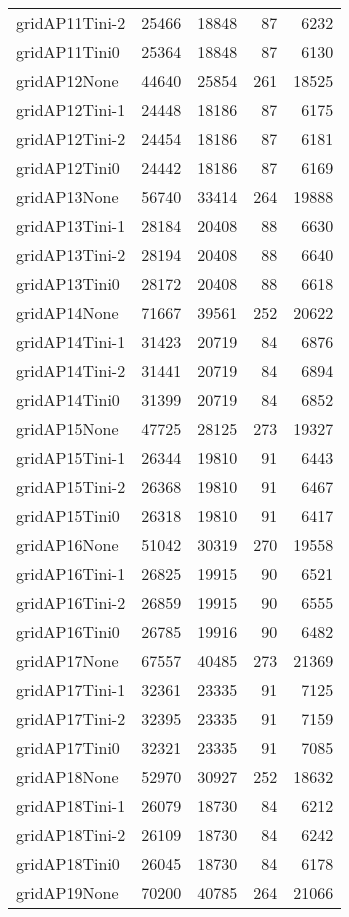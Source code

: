 \begin{longtable}{lrrrr}
gridAP11Tini-2 & 25466 & 18848 & 87 & 6232 \\
gridAP11Tini0 & 25364 & 18848 & 87 & 6130 \\
gridAP12None & 44640 & 25854 & 261 & 18525 \\
gridAP12Tini-1 & 24448 & 18186 & 87 & 6175 \\
gridAP12Tini-2 & 24454 & 18186 & 87 & 6181 \\
gridAP12Tini0 & 24442 & 18186 & 87 & 6169 \\
gridAP13None & 56740 & 33414 & 264 & 19888 \\
gridAP13Tini-1 & 28184 & 20408 & 88 & 6630 \\
gridAP13Tini-2 & 28194 & 20408 & 88 & 6640 \\
gridAP13Tini0 & 28172 & 20408 & 88 & 6618 \\
gridAP14None & 71667 & 39561 & 252 & 20622 \\
gridAP14Tini-1 & 31423 & 20719 & 84 & 6876 \\
gridAP14Tini-2 & 31441 & 20719 & 84 & 6894 \\
gridAP14Tini0 & 31399 & 20719 & 84 & 6852 \\
gridAP15None & 47725 & 28125 & 273 & 19327 \\
gridAP15Tini-1 & 26344 & 19810 & 91 & 6443 \\
gridAP15Tini-2 & 26368 & 19810 & 91 & 6467 \\
gridAP15Tini0 & 26318 & 19810 & 91 & 6417 \\
gridAP16None & 51042 & 30319 & 270 & 19558 \\
gridAP16Tini-1 & 26825 & 19915 & 90 & 6521 \\
gridAP16Tini-2 & 26859 & 19915 & 90 & 6555 \\
gridAP16Tini0 & 26785 & 19916 & 90 & 6482 \\
gridAP17None & 67557 & 40485 & 273 & 21369 \\
gridAP17Tini-1 & 32361 & 23335 & 91 & 7125 \\
gridAP17Tini-2 & 32395 & 23335 & 91 & 7159 \\
gridAP17Tini0 & 32321 & 23335 & 91 & 7085 \\
gridAP18None & 52970 & 30927 & 252 & 18632 \\
gridAP18Tini-1 & 26079 & 18730 & 84 & 6212 \\
gridAP18Tini-2 & 26109 & 18730 & 84 & 6242 \\
gridAP18Tini0 & 26045 & 18730 & 84 & 6178 \\
gridAP19None & 70200 & 40785 & 264 & 21066 \\

\end{longtable}
